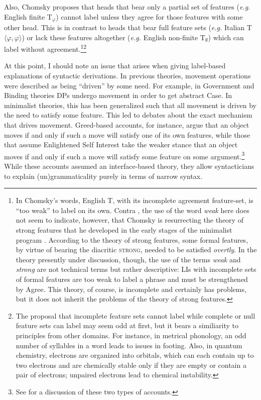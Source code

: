 Also, Chomsky proposes that heads that bear only a partial set of features (\textit{e.g.} English finite T$_\varphi$) cannot label unless they agree for those features with some other head.
This is in contrast to heads that bear full feature sets (\textit{e.g.} Italian T${\langle\varphi,\varphi\rangle}$) or lack these features altogether (\textit{e.g.} English non-finite T$_\emptyset$) which can label without agreement.\footnote{
	In Chomsky's words, English T, with its incomplete agreement feature-set, is ``too weak'' to label on its own. 
	Contra \textcite{gallego2017remark}, the use of the word \textit{weak} here does not seem to indicate, however, that Chomsky is resurrecting the theory of strong features that he developed in the early stages of the minimalist program \parencite{chomsky1995minimalist,chomsky2000minimalist}.
	According to the theory of strong features, some formal features, by virtue of bearing the diacritic \textsc{strong}, needed to be satisfied \textit{overtly}.
	In the theory presently under discussion, though, the use of the terms \textit{weak} and \textit{strong} are not technical terms but rather descriptive: 
	LIs with incomplete sets of formal features are too weak to label a phrase and must be strengthened by Agree.
	This theory, of course, is incomplete and certainly has problems, but it does not inherit the problems of the theory of strong features.
}\footnote{
	The proposal that incomplete feature sets cannot label while complete or null feature sets can label may seem odd at first, but it bears a similiarity to principles from other domains.
	For instance, in metrical phonology, an odd number of syllables in a word leads to issues in footing.
	Also, in quantum chemistry, electrons are organized into orbitals, which can each contain up to two electrons and are chemically stable only if they are empty or contain a pair of electrons; unpaired electrons lead to chemical instability.
}

At this point, I should note an issue that arises when giving label-based explanations of syntactic derivations.
In previous theories, movement operations were described as being ``driven'' by some need.
For example, in Government and Binding theories DPs undergo movement in order to get abstract Case.
In minimalist theories, this has been generalized such that all movement is driven by the need to satisfy some feature.
This led to debates about the exact mechanism that drives movement. 
Greed-based accounts, for instance, argue that an object moves if and only if such a move will satisfy one of its own features, while those that assume Enlightened Self Interest take the weaker stance that an object moves if and only if such a move will satisfy some feature on some argument.\footnote{
	See \textcite{lasnik1999last} for a discussion of these two types of accounts.
}
While these accounts assumed an interface-based theory, they allow syntacticians to explain (un)grammaticality purely in terms of narrow syntax.

